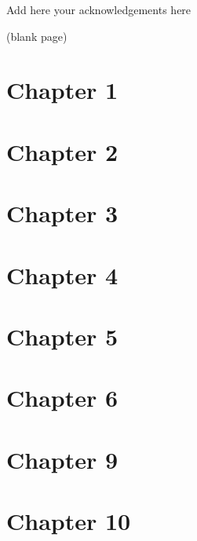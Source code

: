 \begin{justify}
\vspace{0.1 in}
\noindent

Add here your acknowledgements here


\clearpage
\thispagestyle{plain}
(blank page)





\clearpage
\chapter{\fontsize{24pt}{20pt}\selectfont \textbf{Chapter 1}}


\clearpage
\chapter{\fontsize{24pt}{20pt}\selectfont \textbf{Chapter 2}}


\clearpage
\chapter{\fontsize{24pt}{20pt}\selectfont \textbf{Chapter 3}}


\clearpage
\chapter{\fontsize{24pt}{20pt}\selectfont \textbf{Chapter 4}}


\clearpage
\chapter{\fontsize{24pt}{20pt}\selectfont \textbf{Chapter 5}}


\clearpage
\chapter{\fontsize{24pt}{20pt}\selectfont \textbf{Chapter 6}}



\clearpage
\chapter{\fontsize{24pt}{20pt}\selectfont \textbf{Chapter 9}}


\clearpage
\chapter{\fontsize{24pt}{20pt}\selectfont \textbf{Chapter 10}}



\clearpage




\end{justify}

\endinput

